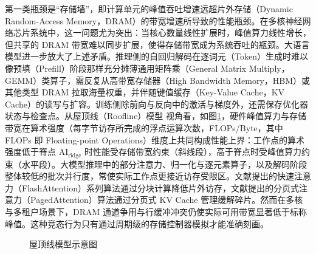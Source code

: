 第一类瓶颈是“存储墙”，即计算单元的峰值吞吐增速远超片外存储（Dynamic Random-Access Memory，DRAM）的带宽增速所导致的性能瓶颈。在多核神经网络芯片系统中，这一问题尤为突出：当核心数量线性扩展时，峰值算力线性增长，但共享的 DRAM 带宽难以同步扩展，使得存储带宽成为系统吞吐的瓶颈\cite{gholami2024aimemorywall}。大语言模型进一步放大了上述矛盾。推理侧的自回归解码在逐词元（Token）生成时难以像预填（Prefill）阶段那样充分摊薄通用矩阵乘（General Matrix Multiply，GEMM）类算子，需反复从高带宽存储器（High Bandwidth Memory，HBM）或其他类型 DRAM 拉取海量权重，并伴随键值缓存（Key-Value Cache，KV Cache）的读写与扩容。训练侧除前向与反向中的激活与梯度外，还需保存优化器状态与检查点。从屋顶线（Roofline）模型\cite{williams2009roofline} 视角看，如图\ref{fig:c1_roofline}，硬件峰值算力与存储带宽在算术强度（每字节访存所完成的浮点运算次数，FLOPs/Byte，其中 FLOPs 即 Floating-point Operations）维度上共同构成性能上界：工作点的算术强度低于脊点 $\mathrm{AI}_\mathrm{ridge}$ 时性能受存储带宽约束（斜线段），高于脊点时受峰值算力约束（水平段）。大模型推理中的部分注意力、归一化与逐元素算子，以及解码阶段整体较低的批次并行度，常使实际工作点更接近访存受限区。文献\parencite{dao2022flashattention,dao2023flashattention2}提出的快速注意力（FlashAttention）系列算法通过分块计算降低片外访存，文献\parencite{kwon2023pagedattention}提出的分页式注意力（PagedAttention）算法通过分页式 KV Cache 管理缓解碎片。然而在多核与多租户场景下，DRAM 通道争用与行缓冲冲突仍使实际可用带宽显著低于标称峰值。这种竞态行为只有通过周期级的存储控制器模拟才能准确刻画。

\begin{figure}[htbp]
  \centering
  \caption{屋顶线模型示意图\cite{williams2009roofline}}
  \label{fig:c1_roofline}
\end{figure}

